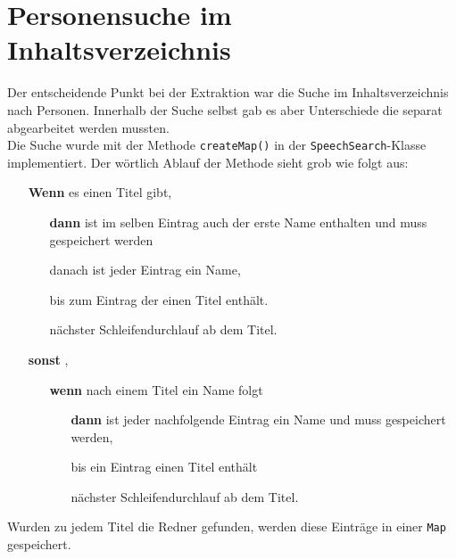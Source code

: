 \section{Personensuche im Inhaltsverzeichnis}
Der entscheidende Punkt bei der Extraktion war die Suche im Inhaltsverzeichnis nach Personen. Innerhalb der Suche selbst gab es aber Unterschiede die separat abgearbeitet werden mussten.\\
Die Suche wurde mit der Methode \lstinline|createMap()| in der \lstinline|SpeechSearch|-Klasse implementiert. Der wörtlich Ablauf der Methode sieht grob wie folgt aus:
\begin{itemize}[leftmargin=3.5em]
	\item[\textbf{Wenn}] es einen Titel  gibt,
	\begin{itemize}
		\item[\textbf{dann}] ist im selben Eintrag auch der erste Name enthalten und muss gespeichert werden
		\item[] danach ist jeder Eintrag ein Name,
		\item[] bis zum Eintrag der einen Titel enthält.
		\item[] nächster Schleifendurchlauf ab dem Titel.
	\end{itemize}
	\item[\textbf{sonst}] ,
	\begin{itemize}
		\item[\textbf{wenn}] nach einem Titel ein Name folgt
		\begin{itemize}
			\item[\textbf{dann}] ist jeder nachfolgende Eintrag ein Name und muss gespeichert werden,
			\item[] bis ein Eintrag einen Titel enthält
			\item[] nächster Schleifendurchlauf ab dem Titel.
		\end{itemize}
	\end{itemize}
\end{itemize}
Wurden zu jedem Titel die Redner gefunden, werden diese Einträge in einer \lstinline|Map| gespeichert.

